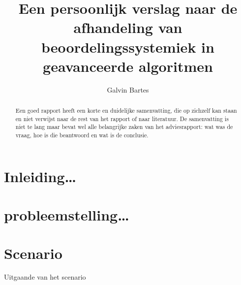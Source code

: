 \documentclass[a4paper,12pt]{article}
\begin{document}
\title{Een persoonlijk verslag naar de afhandeling van beoordelingssystemiek in geavanceerde algoritmen}
\author{Galvin Bartes}
\maketitle
\begin{abstract} %
Een goed rapport heeft een korte en duidelijke samenvatting, die op zichzelf kan staan en niet verwijst naar de rest van het rapport of naar literatuur. De samenvatting is niet te lang maar bevat wel alle belangrijke zaken van het adviesrapport: wat was de vraag, hoe is die beantwoord en wat is de conclusie.
\end{abstract}
\tableofcontents





\newpage
\section{Inleiding\dots}

\newpage
\section{probleemstelling\dots}

\newpage
\section{Scenario}

Uitgaande van het scenario
\end{document}
